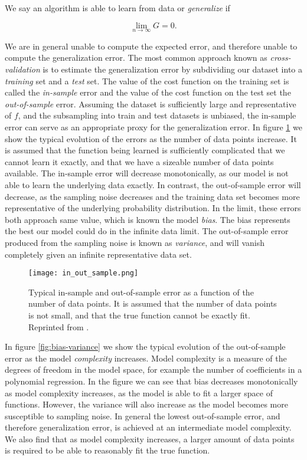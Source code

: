 We say an algorithm is able to learn from data or \textit{generalize} if 

\begin{equation}
 \lim_{n\to\infty} G = 0 .
\end{equation}

We are in general unable to compute the expected error, and therefore unable
to compute the generalization error. The most common approach known as
\textit{cross-validation} is to estimate the
generalization error by subdividing our dataset into a \textit{training} set
and a \textit{test} set. The value of the cost function on the training set
is called the \textit{in-sample} error and the value of the cost
function on the test set the \textit{out-of-sample} error.
Assuming the dataset is sufficiently large and representative of $f$, and the subsampling
into train and test datasets is unbiased, the in-sample error
can serve as an appropriate proxy for the generalization error.
\newline
In figure \ref{fig:in-out}
we show the typical evolution of the errors as the number of data points increase.
It is assumed that the function being learned is sufficiently complicated
that we cannot learn it exactly, and that we have a sizeable number of data points
available. The in-sample error will decrease monotonically, as our model
is not able to learn the underlying data exactly. In contrast, the out-of-sample
error will decrease, as the sampling noise decreases and the training
data set becomes more representative of the underlying probability distribution.
In the limit, these errors both approach same value, which is known the model
\textit{bias}. The bias represents the best our model could do in the infinite data limit.
The out-of-sample error produced from the sampling noise
is known as \textit{variance}, and will vanish completely
given an infinite representative data set.

\begin{figure}[h]
    \centering
    \texttt{[image: in\_out\_sample.png]}
    \caption{Typical in-sample and out-of-sample error as a function
    of the number of data points. It is assumed that the number
    of data points is not small, and that the true function
    cannot be exactly fit. Reprinted from \parencite[Mehta et al. page 11]{
        mehta2019high}.}
    \label{fig:in-out}
\end{figure}

In figure \ref{fig:bias-variance} we show the typical evolution
of the out-of-sample error as the model \textit{complexity} increases.
Model complexity is a measure of the degrees of freedom in the model space,
for example the number of coefficients in a polynomial regression.
In the figure we can see that bias decreases monotonically as model complexity
increases, as the model is able to fit a larger space of functions.
However, the variance will also increase as the model becomes more
susceptible to sampling noise. In general the lowest out-of-sample error,
and therefore generalization error, is achieved at an intermediate
model complexity. We also find that as model complexity increases,
a larger amount of data points is required to be able to reasonably
fit the true function.

